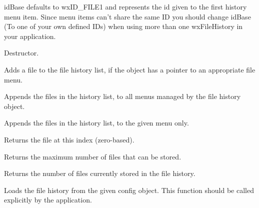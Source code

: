 idBase defaults to wxID_FILE1 and represents the id given to the first history menu item.
Since menu items can't share the same ID you should change idBase (To one of your own
defined IDs) when using more than one wxFileHistory in your application.




Destructor.



Adds a file to the file history list, if the object has a pointer to an appropriate file menu.

\label{wxfilehistoryaddfilestomenu}


Appends the files in the history list, to all menus managed by the file history object.


Appends the files in the history list, to the given menu only.

\label{wxfilehistorygethistoryfile}


Returns the file at this index (zero-based).



Returns the maximum number of files that can be stored.



Returns the number of files currently stored in the file history.



Loads the file history from the given config object. This function should be called explicitly by the application.



